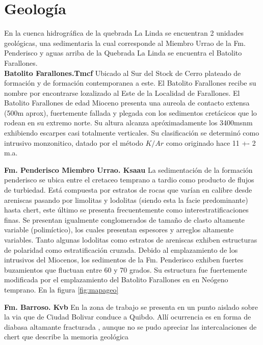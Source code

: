 \section{Geolog\'ia}
En la cuenca hidrogr\'afica de la quebrada La Linda se encuentran 2 unidades geol\'ogicas, una sedimentaria la cual corresponde al Miembro Urrao de la Fm. Penderisco y aguas arriba de la Quebrada La Linda se encuentra el Batolito Farallones.\\

\textbf{Batolito Farallones.Tmcf}
Ubicado al Sur del Stock de Cerro plateado de formaci\'on y de formaci\'on contemporanea a este. El Batolito Farallones recibe su nombre por encontrarse lozalizado al Este de la Localidad de Farallones.
El Batolito Farallones de edad Mioceno presenta una aureola de contacto extensa (500m aprox), fuertemente fallada y plegada con los sedimentos cret\'acicos que lo rodean en su extremo norte. Su altura alcanza apr\'oximadamente los 3400msnm exhibiendo escarpes casi totalmente verticales.
Su clasificaci\'on se determin\'o como intrusivo monzonitico, datado por el m\'etodo $K/Ar$ como originado hace 11 +- 2 m.a. \cite{farallones}
 

\textbf{Fm. Penderisco Miembro Urrao. Ksaau}
La sedimentaci\'on de la formaci\'on penderisco se ubica entre el cretaceo temprano a tardio como producto de flujos de turbiedad.
Est\'a compuesta por estratos de rocas que var\'ian en calibre desde areniscas pasando por limolitas y lodolitas (siendo esta la facie predominante) hasta chert, este \'ultimo se presenta frecuentemente como interestratificaciones finas. Se presentan igualmente conglomerados de tama\~no de clasto altamente variable (polim\'ictico), los cuales presentan espesores y arreglos altamente variables.
Tanto algunas lodolitas como estratos de areniscas exhiben estructuras de polaridad como estratificaci\'on cruzada.
Debido al emplazamiento de los intrusivos del Miocenos, los sedimentos de la Fm. Penderisco exhiben fuertes buzamientos que fluctuan  entre 60 y 70 grados. \cite{urrao}
Su estructura fue fuertemente modificada por el emplazamiento del Batolito Farallones en en Ne\'ogeno temprano. En la figura \ref{fig:mapageo}

\textbf{Fm. Barroso. Kvb}
En la zona de trabajo se presenta en un punto aislado sobre la via que de Ciudad Bolivar conduce a Quibdo.
All\'i ocurrencia es en forma de diabasa altamante fracturada \cite{barroso}, aunque no se pudo apreciar las intercalaciones de chert que describe la memoria geol\'ogica 


